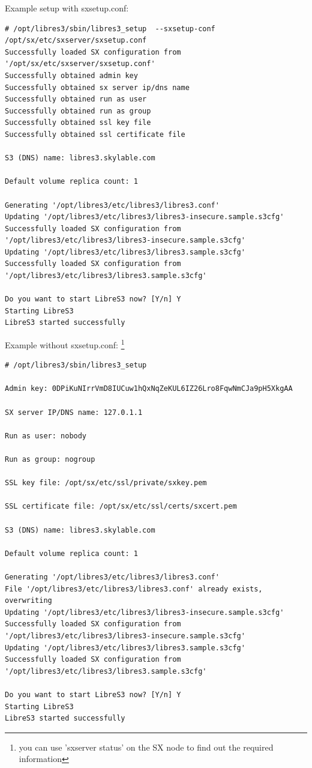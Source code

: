 Example setup with sxsetup.conf:
\small
\begin{lstlisting}
# /opt/libres3/sbin/libres3_setup  --sxsetup-conf /opt/sx/etc/sxserver/sxsetup.conf
Successfully loaded SX configuration from '/opt/sx/etc/sxserver/sxsetup.conf'
Successfully obtained admin key
Successfully obtained sx server ip/dns name
Successfully obtained run as user
Successfully obtained run as group
Successfully obtained ssl key file
Successfully obtained ssl certificate file

S3 (DNS) name: libres3.skylable.com

Default volume replica count: 1

Generating '/opt/libres3/etc/libres3/libres3.conf'
Updating '/opt/libres3/etc/libres3/libres3-insecure.sample.s3cfg'
Successfully loaded SX configuration from '/opt/libres3/etc/libres3/libres3-insecure.sample.s3cfg'
Updating '/opt/libres3/etc/libres3/libres3.sample.s3cfg'
Successfully loaded SX configuration from '/opt/libres3/etc/libres3/libres3.sample.s3cfg'

Do you want to start LibreS3 now? [Y/n] Y
Starting LibreS3
LibreS3 started successfully
\end{lstlisting}
\LARGE

Example without sxsetup.conf:
\footnote{you can use 'sxserver status' on the SX node to find out the required information}
\small
\begin{lstlisting}
# /opt/libres3/sbin/libres3_setup

Admin key: 0DPiKuNIrrVmD8IUCuw1hQxNqZeKUL6IZ26Lro8FqwNmCJa9pH5XkgAA

SX server IP/DNS name: 127.0.1.1

Run as user: nobody

Run as group: nogroup

SSL key file: /opt/sx/etc/ssl/private/sxkey.pem

SSL certificate file: /opt/sx/etc/ssl/certs/sxcert.pem

S3 (DNS) name: libres3.skylable.com

Default volume replica count: 1

Generating '/opt/libres3/etc/libres3/libres3.conf'
File '/opt/libres3/etc/libres3/libres3.conf' already exists, overwriting
Updating '/opt/libres3/etc/libres3/libres3-insecure.sample.s3cfg'
Successfully loaded SX configuration from '/opt/libres3/etc/libres3/libres3-insecure.sample.s3cfg'
Updating '/opt/libres3/etc/libres3/libres3.sample.s3cfg'
Successfully loaded SX configuration from '/opt/libres3/etc/libres3/libres3.sample.s3cfg'

Do you want to start LibreS3 now? [Y/n] Y
Starting LibreS3
LibreS3 started successfully
\end{lstlisting}
\LARGE

